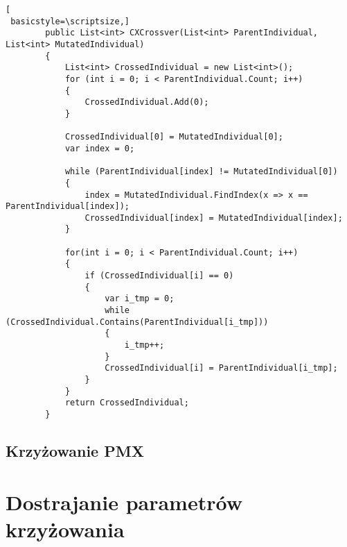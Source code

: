 \begin{program}[h!]
\begin{lstlisting}[
 basicstyle=\scriptsize,]
        public List<int> CXCrossver(List<int> ParentIndividual, List<int> MutatedIndividual)
        {
            List<int> CrossedIndividual = new List<int>();
            for (int i = 0; i < ParentIndividual.Count; i++)
            {
                CrossedIndividual.Add(0);
            }

            CrossedIndividual[0] = MutatedIndividual[0];
            var index = 0;

            while (ParentIndividual[index] != MutatedIndividual[0])
            {
                index = MutatedIndividual.FindIndex(x => x == ParentIndividual[index]);
                CrossedIndividual[index] = MutatedIndividual[index];
            }

            for(int i = 0; i < ParentIndividual.Count; i++)
            {
                if (CrossedIndividual[i] == 0)
                {
                    var i_tmp = 0;
                    while (CrossedIndividual.Contains(ParentIndividual[i_tmp]))
                    {
                        i_tmp++;
                    }
                    CrossedIndividual[i] = ParentIndividual[i_tmp];
                }
            }
            return CrossedIndividual;
        }
\end{lstlisting}
\end{program}
































\subsection{Krzyżowanie PMX}\label{sec:kompilacja}


\section{Dostrajanie parametrów krzyżowania}\label{dostrajaniecr}
